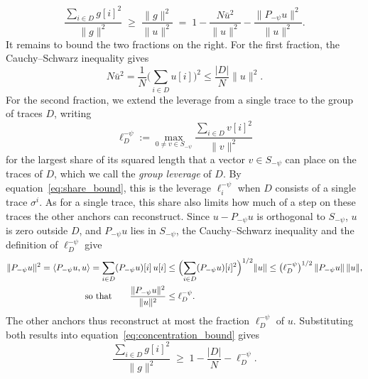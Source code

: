 \documentclass[titlepage,a4paper,11pt]{report}
\begin{document}
    \begin{equation}\label{eq:concentration_bound}
        \frac{\sum_{i\in D}g[i]^2}{\lVert g\rVert^2}\;\ge\;\frac{\lVert g\rVert^2}{\lVert u\rVert^2}\;=\;1-\frac{N\bar u^2}{\lVert u\rVert^2}-\frac{\lVert P_{-\psi}u\rVert^2}{\lVert u\rVert^2}.
    \end{equation}
    It remains to bound the two fractions on the right. For the first fraction, the Cauchy--Schwarz inequality gives
    \begin{equation*}
        N\bar u^2=\frac1N\bigl(\sum_{i\in D}u[i]\bigr)^2\le\frac{|D|}{N}\lVert u\rVert^2.
    \end{equation*}
    For the second fraction, we extend the leverage from a single trace to the group of traces $D$, writing
    \begin{equation}\label{eq:group_leverage}
        \ell_D^{-\psi}:=\max_{0\neq v\in S_{-\psi}}\frac{\sum_{i\in D}v[i]^2}{\lVert v\rVert^2}
    \end{equation}
    for the largest share of its squared length that a vector $v\in S_{-\psi}$ can place on the traces of $D$, which we call the \emph{group leverage} of $D$. By equation~\eqref{eq:share_bound}, this is the leverage $\ell_i^{-\psi}$ when $D$ consists of a single trace $\sigma^i$. As for a single trace, this share also limits how much of a step on these traces the other anchors can reconstruct. Since $u-P_{-\psi}u$ is orthogonal to $S_{-\psi}$, $u$ is zero outside $D$, and $P_{-\psi}u$ lies in $S_{-\psi}$, the Cauchy--Schwarz inequality and the definition of $\ell_D^{-\psi}$ give
    \begin{equation*}
    \begin{split}
        \lVert P_{-\psi}u\rVert^2=\langle P_{-\psi}u,u\rangle=\sum_{i\in D}(P_{-\psi}u)[i]\,u[i]&\le\Bigl(\sum_{i\in D}(P_{-\psi}u)[i]^2\Bigr)^{1/2}\lVert u\rVert\le\bigl(\ell_D^{-\psi}\bigr)^{1/2}\,\lVert P_{-\psi}u\rVert\,\lVert u\rVert,\\
        \text{so that}\qquad\frac{\lVert P_{-\psi}u\rVert^2}{\lVert u\rVert^2}&\le\ell_D^{-\psi}.
    \end{split}
    \end{equation*}
    The other anchors thus reconstruct at most the fraction $\ell_D^{-\psi}$ of $u$. Substituting both results into equation~\eqref{eq:concentration_bound} gives
    \begin{equation}\label{eq:near_redundant_concentration}
        \frac{\sum_{i\in D}g[i]^2}{\lVert g\rVert^2}\;\ge\;1-\frac{|D|}{N}-\ell_D^{-\psi}.
    \end{equation}
    
\end{document}

